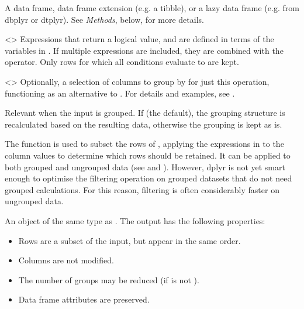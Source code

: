 \documentclass[a4paper]{book}
\begin{document}
%
\begin{Arguments}
\begin{ldescription}
\item[\code{.data}] A data frame, data frame extension (e.g. a tibble), or a
lazy data frame (e.g. from dbplyr or dtplyr). See \emph{Methods}, below, for
more details.

\item[\code{...}] <> Expressions that
return a logical value, and are defined in terms of the variables in
. If multiple expressions are included, they are combined with the
\code{\&} operator. Only rows for which all conditions evaluate to  are
kept.

\item[\code{.by}] \strong{[Experimental]}

<> Optionally, a selection of columns to
group by for just this operation, functioning as an alternative to . For
details and examples, see .

\item[\code{.preserve}] Relevant when the  input is grouped.
If  (the default), the grouping structure
is recalculated based on the resulting data, otherwise the grouping is kept as is.
\end{ldescription}
\end{Arguments}
%
\begin{Details}
The  function is used to subset the rows of
, applying the expressions in  to the column values to determine which
rows should be retained. It can be applied to both grouped and ungrouped data (see  and
). However, dplyr is not yet smart enough to optimise the filtering
operation on grouped datasets that do not need grouped calculations. For this
reason, filtering is often considerably faster on ungrouped data.
\end{Details}
%
\begin{Value}
An object of the same type as . The output has the following properties:
\begin{itemize}

\item{} Rows are a subset of the input, but appear in the same order.
\item{} Columns are not modified.
\item{} The number of groups may be reduced (if  is not ).
\item{} Data frame attributes are preserved.

\end{itemize}

\end{Value}
\end{document}
